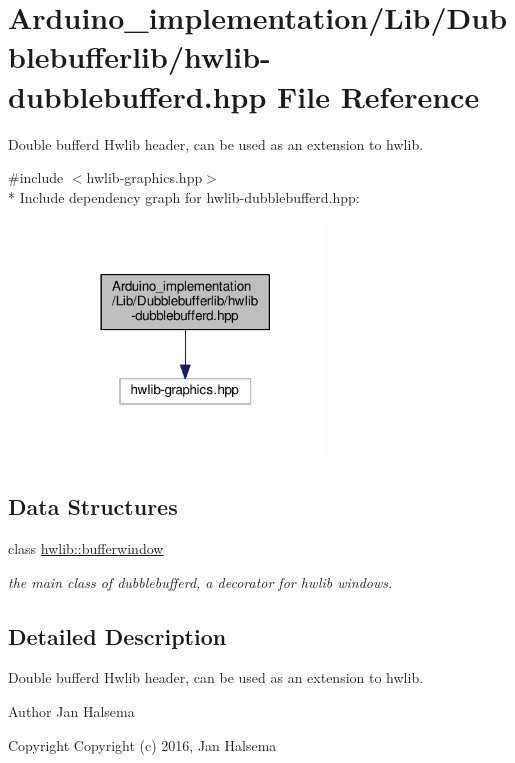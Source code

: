 \hypertarget{hwlib-dubblebufferd_8hpp}{\section{Arduino\+\_\+implementation/\+Lib/\+Dubblebufferlib/hwlib-\/dubblebufferd.hpp File Reference}
\label{hwlib-dubblebufferd_8hpp}
}


Double bufferd Hwlib header, can be used as an extension to hwlib.  


{\ttfamily \#include $<$hwlib-\/graphics.\+hpp$>$}\\*
Include dependency graph for hwlib-\/dubblebufferd.hpp\+:
\nopagebreak
\begin{figure}[H]
\begin{center}
\leavevmode
\includegraphics[width=206pt]{hwlib-dubblebufferd_8hpp__incl}
\end{center}
\end{figure}
\subsection*{Data Structures}
\begin{DoxyCompactItemize}
\item 
class \hyperlink{classhwlib_1_1bufferwindow}{hwlib\+::bufferwindow}
\begin{DoxyCompactList}\small\item\em the main class of dubblebufferd, a decorator for hwlib windows. \end{DoxyCompactList}\end{DoxyCompactItemize}


\subsection{Detailed Description}
Double bufferd Hwlib header, can be used as an extension to hwlib. 

\begin{DoxyAuthor}{Author}
Jan Halsema 
\end{DoxyAuthor}
\begin{DoxyCopyright}{Copyright}
Copyright (c) 2016, Jan Halsema 
\end{DoxyCopyright}
